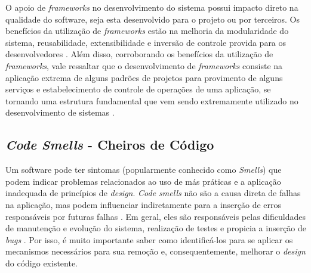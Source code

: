%

O apoio de \emph{frameworks} no desenvolvimento do sistema possui impacto direto na qualidade do software, seja esta desenvolvido para o projeto ou por terceiros. Os benefícios da utilização de \emph{frameworks} estão na melhoria da modularidade do sistema, reusabilidade, extensibilidade e inversão de controle provida para os desenvolvedores \cite{fayad1997}. Além disso, corroborando os benefícios da utilização de \emph{frameworks}, vale ressaltar que o desenvolvimento de \emph{frameworks} consiste na aplicação extrema de alguns padrões de projetos para provimento de alguns serviços e estabelecimento de controle de operações de uma aplicação, se tornando uma estrutura fundamental que vem sendo extremamente utilizado no desenvolvimento de sistemas \cite{fayad1997}.

%




\subsection{\emph{Code Smells} - Cheiros de Código}
\label{sec-bad-smells}

Um software pode ter sintomas (popularmente conhecido como \emph{Smells}) que podem indicar problemas relacionados ao uso de más práticas e a aplicação inadequada de princípios de \emph{design}. \emph{Code smells} não são a causa direta de falhas na aplicação, mas podem influenciar indiretamente para a inserção de erros responsáveis por futuras falhas \cite{fowler1999}. Em geral, eles são responsáveis pelas dificuldades de manutenção e evolução do sistema, realização de testes e propicia a inserção de \emph{bugs} \cite{mansoor2014}. Por isso, é muito importante saber como identificá-los para se aplicar os mecanismos necessários para sua remoção e, consequentemente, melhorar o \emph{design} do código existente. 

